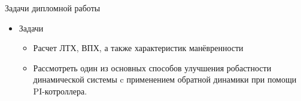 \begin{frame}{Задачи дипломной работы}
\begin{itemize}
    \item  [] \begin{block}{Задачи}
        \begin{itemize}
        \item Расчет ЛТХ, ВПХ, а также характеристик манёвренности
        \item Рассмотреть один из основных способов улучшения робастности динамической 
        системы c применением обратной динамики при помощи PI-котроллера.
        \end{itemize}
    \end{block}
\end{itemize}    
\end{frame}